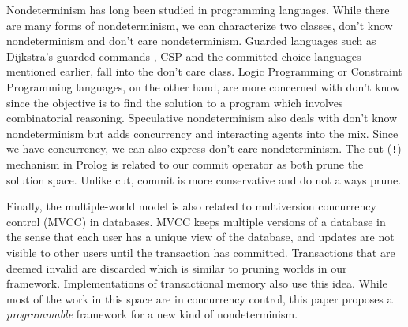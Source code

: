Nondeterminism has long been studied in programming languages.
While there are many forms of nondeterminism, we can characterize two classes,
don't know nondeterminism and don't care nondeterminism.
Guarded languages such as Dijkstra's guarded commands \cite{Dijkstra75:guarded},
CSP \cite{Hoare85:CSP} and the committed choice languages mentioned earlier, 
fall into the don't care class.
Logic Programming or Constraint Programming languages, on the other hand,
are more concerned with don't know since the objective is to find the
solution to a program which involves combinatorial reasoning.
Speculative nondeterminism also deals with don't know nondeterminism but
adds concurrency and interacting agents into the mix.
Since we have concurrency, we can also express don't care nondeterminism.
The cut ({\tt !}) mechanism in Prolog \cite{DantsinEGV01} is related to our commit
operator as both prune the solution space.
Unlike cut, commit is more conservative and do not always prune.


Finally, the multiple-world model is also related to
multiversion concurrency control (MVCC) 
\cite{BernsteinG83,BestavrosB94} in databases. 
MVCC keeps multiple versions of a database in the sense that each user has
a unique view of the database, and updates are not visible to other users
until the transaction has committed. 
Transactions that are deemed invalid are discarded which is similar
to pruning worlds in our framework.
Implementations of transactional memory also use this idea.
While most of the work in this space are in
concurrency control, this paper proposes a 
{\em programmable} framework for a new kind of nondeterminism.

